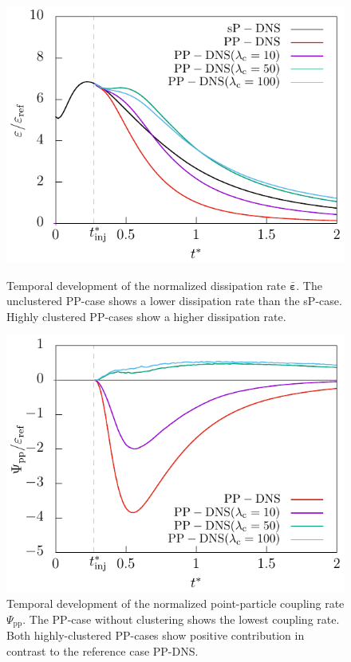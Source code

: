 \documentclass[11pt,a4paper,openany,oneside,parskip=half*]{article}
\renewcommand*\vec[1]{\boldsymbol{#1}}
\begin{document}
\begin{figure}[]
    \centering
    \begin{minipage}[t]{0.5\textwidth}
         \centering
        \includegraphics[width=\linewidth]{./Abbildungen/256/diss_time.pdf}
        \caption{Temporal development of the normalized dissipation rate $\bar{\vec{\varepsilon}}$. The unclustered PP-case shows a lower dissipation rate than the sP-case. Highly clustered PP-cases show a higher dissipation rate.}
        \label{diss_time_256}
    \end{minipage}%
    \begin{minipage}[t]{0.5\textwidth}
        \centering
        \includegraphics[width=\linewidth]{./Abbildungen/256/coupling_time.pdf}
        \caption{Temporal development of the normalized point-particle coupling rate $\Psi_\mathrm{pp}$. The PP-case without clustering shows the lowest coupling rate. Both highly-clustered PP-cases show positive contribution in contrast to the reference case PP-DNS.}
        \label{coupling_time_256}
    \end{minipage}
\end{figure}%
\end{document}
